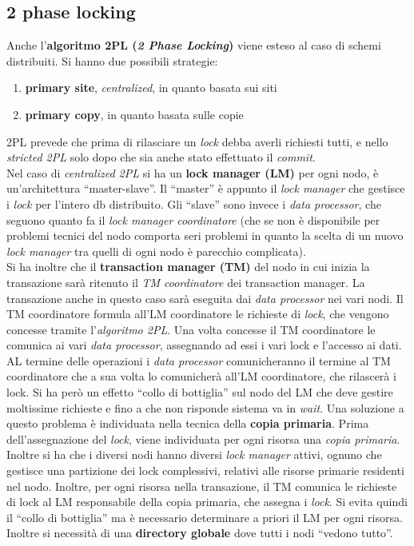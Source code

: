 \documentclass[a4paper,12pt, oneside]{book}
\begin{document}
\subsection{2 phase locking}
Anche l'\textbf{algoritmo 2PL (\textit{2 Phase Locking})} viene esteso al caso
di schemi distribuiti. Si hanno due possibili strategie:
\begin{enumerate}
  \item \textbf{primary site}, \textit{centralized}, in quanto
  basata sui siti
  \item \textbf{primary copy}, in quanto basata sulle copie
\end{enumerate}
2PL prevede che prima di rilasciare un \textit{lock} debba averli richiesti
tutti, e nello \textit{stricted 2PL} solo dopo che sia anche stato effettuato il
\textit{commit}.\\
Nel caso di \textit{centralized 2PL} si ha un \textbf{lock manager (LM)} per
ogni nodo, è un'architettura ``master-slave''. Il ``master'' è appunto il
\textit{lock manager} che gestisce i \textit{lock} per l'intero db
distribuito. Gli ``slave'' sono invece i \textit{data processor}, che seguono
quanto fa il \textit{lock manager coordinatore} (che se non è disponibile per
problemi tecnici del nodo comporta seri problemi in quanto la scelta di un nuovo
\textit{lock manager} tra quelli di ogni nodo è parecchio complicata).\\
Si ha inoltre che il \textbf{transaction manager (TM)} del nodo in cui inizia la
transazione sarà ritenuto il \textit{TM coordinatore} dei transaction
manager. La transazione anche in questo caso sarà eseguita dai \textit{data
  processor} nei vari nodi. Il TM coordinatore formula all'LM coordinatore le
richieste di \textit{lock}, che vengono concesse tramite l'\textit{algoritmo
  2PL}. Una volta concesse il TM coordinatore le comunica ai vari \textit{data
  processor}, assegnando ad essi i vari lock e l'accesso ai dati. AL termine
delle operazioni i \textit{data processor} comunicheranno il termine al TM
coordinatore che a sua volta lo comunicherà all'LM coordinatore, che rilascerà i
lock. Si ha però un effetto ``collo di bottiglia'' sul nodo del LM che deve
gestire moltissime richieste e fino a che non risponde sistema va in
\textit{wait}. Una soluzione a questo problema è individuata nella tecnica della
\textbf{copia primaria}. Prima dell'assegnazione del \textit{lock}, viene
individuata per ogni risorsa una \textit{copia primaria}. Inoltre si ha che i
diversi nodi hanno diversi \textit{lock manager} attivi, ognuno che gestisce una
partizione dei lock complessivi, relativi alle risorse primarie residenti nel
nodo. Inoltre, per ogni risorsa nella transazione, il TM comunica le richieste
di lock al LM responsabile della copia primaria, che assegna i \textit{lock}. Si
evita quindi il ``collo di bottiglia'' ma è necessario determinare a priori il
LM per ogni risorsa. Inoltre si necessità di una \textbf{directory globale} dove
tutti i nodi ``vedono tutto''.
\end{document}
